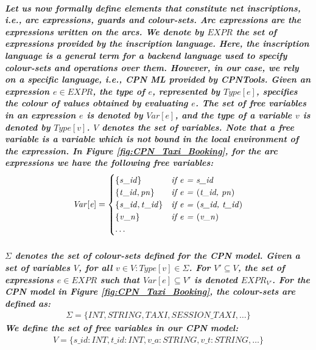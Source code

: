 \subparagraph*{\textnormal{Let us now formally define elements that constitute \textbf{net inscriptions}, i.e., arc expressions, guards and colour-sets. Arc expressions are the expressions written on the arcs. We denote by $\mathit{EXPR}$ the set of expressions provided by the inscription language. Here, the inscription language is a general term for a backend language used to specify colour-sets and operations over them. However, in our case, we rely on a specific language, i.e., CPN ML provided by CPNTools. Given an expression $\mathit{e \in EXPR}$, the \textbf{\textit{type}} of $\mathit{e}$, represented by $\mathit{Type[e]}$, specifies the colour of values obtained by evaluating $\mathit{e}$. The set of \textbf{\textit{free variables}} in an expression $\mathit{e}$ is denoted by $\mathit{Var[e]}$, and the type of a variable $\mathit{v}$ is denoted by $\mathit{Type[v]}$. $\mathit{V}$ denotes the set of variables. Note that a free variable is a variable which is not bound in the local environment of the expression.
In Figure \ref{fig:CPN_Taxi_Booking}, for the arc expressions we have the following free variables:
\begin{equation*}
\mathit{Var[e]} = \begin{cases}
\mathit{\{s\_id\}} & \textit{if e = s\_id}\\ 
\mathit{\{t\_id, pn\}} & \textit{if e = \textnormal{(}t\_id, pn\textnormal{)}} \\ 
\mathit{\{s\_id, t\_id\}} & \textit{if e = \textnormal{(}s\_id, t\_id\textnormal{)}} \\ 
\mathit{\{v\_n\}} & \textit{if e = \textnormal{(}v\_n\textnormal{)}}\\ 
\ldots
\end{cases}
\end{equation*}}}
\subparagraph*{\textnormal{$\mathit{\Sigma}$ denotes the set of \textbf{\textit{colour-sets}} defined for the CPN model. Given a set of variables $\mathit{V}$, for all $\mathit{v \in V : Type[v] \in \Sigma}$. For $\mathit{V' \subseteq V}$, the set of expressions $\mathit{e \in EXPR}$ such that $\mathit{Var[e] \subseteq V'}$ is denoted $\mathit{EXPR_{V'}}$. For the CPN model in Figure \ref{fig:CPN_Taxi_Booking}, the colour-sets are defined as:
\begin{equation*}
\begin{aligned}
\mathit{\Sigma = \{ INT, STRING, TAXI, SESSION\_TAXI, \ldots \}}
\end{aligned}
\end{equation*}
We define the set of free variables in our CPN model:
\begin{equation*}
\begin{aligned}
\mathit{V = \{s\_id : INT, t\_id : INT, v\_a : STRING, v\_t : STRING, \ldots\}}
\end{aligned}
\end{equation*}}}

